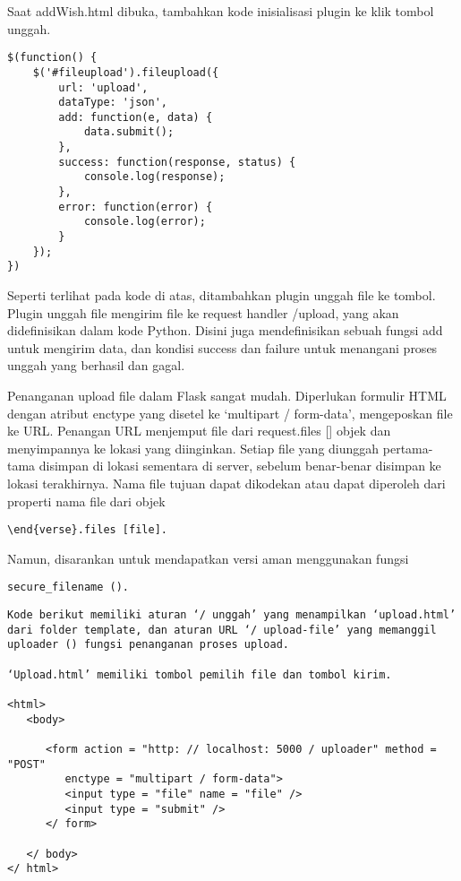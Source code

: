 \documentclass[12pt,a4paper]{article}
\begin{document}
Saat addWish.html dibuka, tambahkan kode inisialisasi plugin ke klik tombol unggah.

\begin{verbatim}
$(function() {
    $('#fileupload').fileupload({
        url: 'upload',
        dataType: 'json',
        add: function(e, data) {
            data.submit();
        },
        success: function(response, status) {
            console.log(response);
        },
        error: function(error) {
            console.log(error);
        }
    });
})
\end{verbatim}


Seperti terlihat pada kode di atas, ditambahkan plugin unggah file ke tombol. Plugin unggah file mengirim file ke request handler /upload, yang akan didefinisikan dalam kode Python. Disini juga mendefinisikan sebuah fungsi add untuk mengirim data, dan kondisi success dan failure untuk menangani proses unggah yang berhasil dan gagal.




Penanganan upload file dalam Flask sangat mudah. Diperlukan formulir HTML dengan atribut enctype yang disetel ke ‘multipart / form-data’, mengeposkan file ke URL. Penangan URL menjemput file dari request.files [] objek dan menyimpannya ke lokasi yang diinginkan. Setiap file yang diunggah pertama-tama disimpan di lokasi sementara di server, sebelum benar-benar disimpan ke lokasi terakhirnya. Nama file tujuan dapat dikodekan atau dapat diperoleh dari properti nama file dari objek 

\begin{verbatim}
\end{verse}.files [file]. 
\end{verbatim}
Namun, disarankan untuk mendapatkan versi aman menggunakan fungsi 


\begin{verbatim}
secure_filename ().
\end{verbatim}


\begin{verbatim}
Kode berikut memiliki aturan ‘/ unggah’ yang menampilkan ‘upload.html’ dari folder template, dan aturan URL ‘/ upload-file’ yang memanggil uploader () fungsi penanganan proses upload.

‘Upload.html’ memiliki tombol pemilih file dan tombol kirim.

<html>
   <body>
   
      <form action = "http: // localhost: 5000 / uploader" method = "POST"
         enctype = "multipart / form-data">
         <input type = "file" name = "file" />
         <input type = "submit" />
      </ form>
      
   </ body>
</ html>

\end{verbatim}
\end{document}
